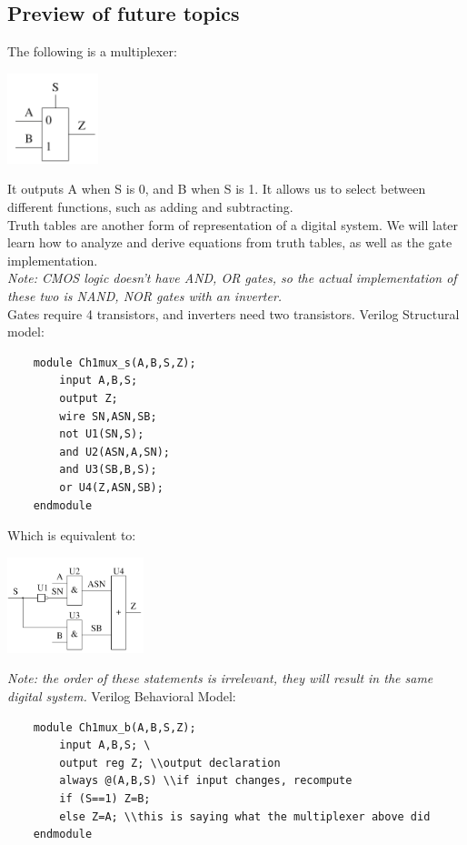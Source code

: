 \documentclass[nobib]{tufte-handout}
\begin{document}
\subsection{Preview of future topics}
The following is a multiplexer:
\begin{center}
    \includegraphics[width= 100px]{images/multiplexer.png}
\end{center}
It outputs A when S is 0, and B when S is 1. It allows us to select between different functions, such as adding and subtracting.\\
Truth tables are another form of representation of a digital system. We will later learn how to analyze and derive equations from truth tables, as well as the gate implementation.\\
\textit{Note: CMOS logic doesn't have AND, OR gates, so the actual implementation of these two is NAND, NOR gates with an inverter.}\\
Gates require 4 transistors, and inverters need two transistors.
Verilog Structural model:
\begin{lstlisting}
    module Ch1mux_s(A,B,S,Z);
        input A,B,S;
        output Z;
        wire SN,ASN,SB;
        not U1(SN,S);
        and U2(ASN,A,SN);
        and U3(SB,B,S);
        or U4(Z,ASN,SB);
    endmodule
\end{lstlisting}
Which is equivalent to:
\begin{center}
    \includegraphics[width= 150px]{images/verilog_implementation.png}
\end{center}
\textit{Note: the order of these statements is irrelevant, they will result in the same digital system.}
Verilog Behavioral Model:
\begin{lstlisting}
    module Ch1mux_b(A,B,S,Z);
        input A,B,S; \
        output reg Z; \\output declaration
        always @(A,B,S) \\if input changes, recompute
        if (S==1) Z=B; 
        else Z=A; \\this is saying what the multiplexer above did
    endmodule
\end{lstlisting}
\end{document}
